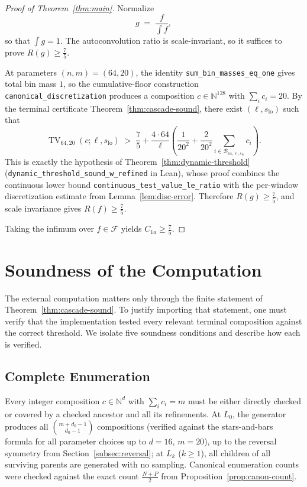 \documentclass[11pt, letterpaper]{article}
\theoremstyle{paperplain}
\theoremstyle{paperdef}
\newcommand{\N}{\mathbb{N}}
\begin{document}
\begin{proof}[Proof of Theorem~\ref{thm:main}]
Normalize
\[
  g \;=\; \frac{f}{\int f},
\]
so that $\int g = 1$.  The autoconvolution ratio is scale-invariant,
so it suffices to prove $R(g)\ge \tfrac75$.

At parameters $(n,m)=(64,20)$, the identity
\texttt{sum\_bin\_masses\_eq\_one} gives total bin mass $1$, so the
cumulative-floor construction
\texttt{canonical\_discretization} produces a composition
$c\in\N^{128}$ with $\sum_i c_i=20$.  By the terminal certificate
Theorem~\ref{thm:cascade-sound}, there exist
$(\ell,s_{\mathrm{lo}})$ such that
\[
  \operatorname{TV}_{64,20}(c;\ell,s_{\mathrm{lo}})
  \;>\;
  \frac75
  +
  \frac{4\cdot 64}{\ell}
  \left(
    \frac{1}{20^2}
    +
    \frac{2}{20^2}
    \sum_{i\in\mathcal{B}_{64,\ell,s_{\mathrm{lo}}}} c_i
  \right).
\]
This is exactly the hypothesis of
Theorem~\ref{thm:dynamic-threshold}
(\texttt{dynamic\_threshold\_sound\_w\_refined} in Lean), whose proof combines
the continuous lower bound
\texttt{continuous\_test\_value\_le\_ratio}
with the per-window discretization estimate from
Lemma~\ref{lem:disc-error}.  Therefore $R(g)\ge \tfrac75$, and
scale invariance gives $R(f)\ge \tfrac75$.

Taking the infimum over $f\in\mathcal{F}$ yields
$C_{1a}\ge \tfrac75$.
\end{proof}


\section{Soundness of the Computation}\label{sec:correctness}

The external computation matters only through the finite statement of
Theorem~\ref{thm:cascade-sound}.  To justify importing that statement,
one must verify that the implementation tested every relevant terminal
composition against the correct threshold.  We isolate five soundness
conditions and describe how each is verified.

\subsection{Complete Enumeration}

Every integer composition
$c \in \N^d$ with $\sum_i c_i = m$ must be either directly checked or
covered by a checked ancestor and all its refinements.
At $L_0$, the generator produces all $\binom{m + d_0 - 1}{d_0 - 1}$
compositions (verified against the stars-and-bars formula for all
parameter choices up to $d=16$, $m=20$), up to the reversal symmetry
from Section~\ref{subsec:reversal}; at $L_k$ ($k \ge 1$), all children
of all surviving parents are generated with no sampling.  Canonical
enumeration counts were checked against the exact count
$\tfrac{N+P}{2}$ from Proposition~\ref{prop:canon-count}.
\end{document}
